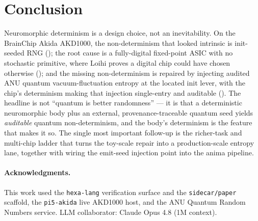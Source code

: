 \documentclass[11pt,a4paper]{article}
\providecommand{\tierGreen}{🟢}
\providecommand{\tierRed}{🔴}
\renewcommand{\tierGreen}{{\color{green!55!black}\textbullet}}
\renewcommand{\tierRed}{{\color{red!75!black}\textbullet}}
\begin{document}
\section{Conclusion}
\label{sec:conclusion}

Neuromorphic determinism is a design choice, not an inevitability. On the
BrainChip Akida AKD1000, the non-determinism that looked intrinsic is
init-seeded RNG (\tierRed); the root cause is a fully-digital fixed-point
ASIC with no stochastic primitive, where Loihi proves a digital chip could
have chosen otherwise (\tierGreen); and the missing non-determinism is
repaired by injecting audited ANU quantum vacuum-fluctuation entropy at the
located init lever, with the chip's determinism making that injection
single-entry and auditable (\tierGreen). The headline is not ``quantum is
better randomness'' --- it is that a deterministic neuromorphic body plus an
external, provenance-traceable quantum seed yields \emph{auditable} quantum
non-determinism, and the body's determinism is the feature that makes it so.
The single most important follow-up is the richer-task and multi-chip ladder
that turns the toy-scale repair into a production-scale entropy lane,
together with wiring the emit-seed injection point into the anima pipeline.

\paragraph{Acknowledgments.}
This work used the \texttt{hexa-lang} verification surface and the
\texttt{sidecar/paper} scaffold, the \texttt{pi5-akida} live AKD1000 host,
and the ANU Quantum Random Numbers service. LLM collaborator: Claude Opus
4.8 (1M context).



\end{document}
